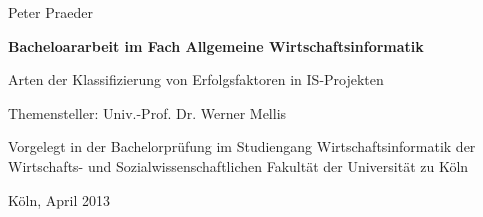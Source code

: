 \vspace*{1mm}

\thispagestyle{empty}
Peter Praeder

\vspace*{23mm}

\begin{center}
\textbf{
Bacheloararbeit\linebreak
im Fach Allgemeine Wirtschaftsinformatik}
\end{center}

\vspace*{20mm}

\begin{center}
\LARGE 
    Arten der Klassifizierung von Erfolgsfaktoren in IS-Projekten
\end{center}

\vspace*{8mm}

\begin{center}
    Themensteller: Univ.-Prof. Dr. Werner Mellis
\end{center}

\vspace*{12mm}

\begin{center}
    Vorgelegt in der Bachelorprüfung
\linebreak
    im Studiengang Wirtschaftsinformatik
\linebreak
    der Wirtschafts- und Sozialwissenschaftlichen Fakultät
\linebreak
    der Universität zu Köln
\end{center}
\vspace*{30mm}

\begin{center}
Köln, April 2013
\end{center}